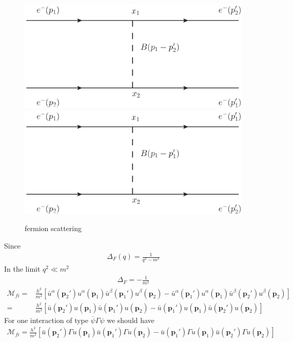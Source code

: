 \begin{figure} %
  \centering %
\includegraphics{scattering} %
 \includegraphics{scattering2} %
  \caption{fermion scattering} %
  \label{fig:sct} %
\end{figure} %
Since
\begin{align}
  \Delta_F(q)=\frac{1}{q^2-m^2}
\end{align}
In the limit $q^2\ll m^2$
\begin{align}
  \Delta_F=-\frac{1}{m^2}
\end{align}
\begin{align}
  \mathcal{M}_{fi}=&\frac{h^2}{m^2}\left[
\bar{u}^\alpha(\mathbf{p}_2')u^\alpha(\mathbf{p}_1)\bar{u}^\beta(\mathbf{p}_1')u^\beta(\mathbf{p}_2)
-\bar{u}^\alpha(\mathbf{p}_1')u^\alpha(\mathbf{p}_1)\bar{u}^\beta(\mathbf{p}_2')u^\beta(\mathbf{p}_2)
\right]\nonumber\\
=&\frac{h^2}{m^2}\left[
\bar{u}(\mathbf{p}_2')u(\mathbf{p}_1)\bar{u}(\mathbf{p}_1')u(\mathbf{p}_2)
-\bar{u}(\mathbf{p}_1')u(\mathbf{p}_1)\bar{u}(\mathbf{p}_2')u(\mathbf{p}_2)
\right]
\end{align}
For one interaction of type $\overline{\psi}\Gamma\psi$ we should have
\begin{align}
  \mathcal{M}_{fi}=\frac{h^2}{m^2}\left[
\bar{u}(\mathbf{p}_2')\Gamma u(\mathbf{p}_1)\bar{u}(\mathbf{p}_1')\Gamma u(\mathbf{p}_2)
-\bar{u}(\mathbf{p}_1')\Gamma u(\mathbf{p}_1)\bar{u}(\mathbf{p}_2')\Gamma u(\mathbf{p}_2)
\right]
\end{align}
